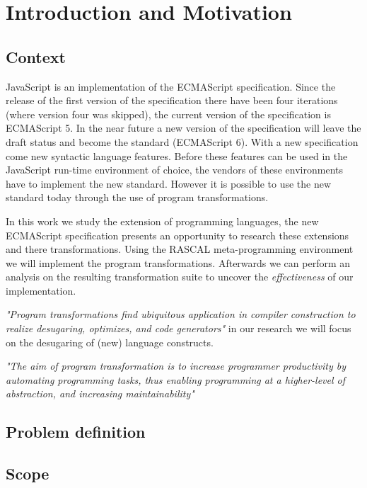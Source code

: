 
\chapter{Introduction and Motivation}

\label{Chapter1}


\section{Context}
JavaScript is an implementation of the ECMAScript specification. Since the release of the first version of the specification there have been four iterations (where version four was skipped), the current version of the specification is ECMAScript 5. In the near future a new version of the specification will leave the draft status and become the standard (ECMAScript 6). With a new specification come new syntactic language features. Before these features can be used in the JavaScript run-time environment of choice, the vendors of these environments have to implement the new standard. However it is possible to use the new standard today through the use of program transformations.

In this work we study the extension of programming languages, the new ECMAScript specification presents an opportunity to research these extensions and there transformations. Using the RASCAL meta-programming environment\citep{Klint} we will implement the program transformations. Afterwards we can perform an analysis on the resulting transformation suite to uncover the \emph{effectiveness} of our implementation.

\textit{"Program transformations find ubiquitous application in compiler construction to realize desugaring, optimizes, and code generators"}\cite{Erdweg2014} 
in our research we will focus on the desugaring of (new) language constructs.  

\textit{"The aim of program transformation is to increase programmer productivity by automating programming tasks, thus enabling programming at a higher-level of abstraction, and increasing maintainability"}\cite{Visser2001}

\section{Problem definition}

\section{Scope}

